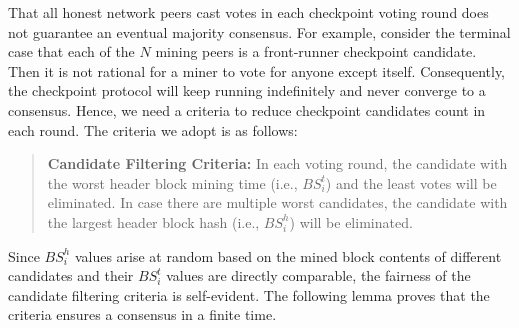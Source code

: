 \documentclass[conference]{IEEEtran}
\begin{document}
That all honest network peers cast votes in each checkpoint voting round does not guarantee an eventual majority consensus. For example, consider the terminal case that each of the $N$ mining peers is a front-runner checkpoint candidate. Then it is not rational for a miner to vote for anyone except itself. Consequently, the checkpoint protocol will keep running indefinitely and never converge to a consensus. Hence, we need a criteria to reduce checkpoint candidates count in each round. The criteria we adopt is as follows:

\begin{quotation}
\textbf{Candidate Filtering Criteria:} In each voting round, the candidate with the worst header block mining time (i.e., $BS_i^t$) and the least votes will be eliminated. In case there are multiple worst candidates, the candidate with the largest header block hash (i.e., $BS_i^h$) will be eliminated.   
\end{quotation}        

Since $BS_i^h$ values arise at random based on the mined block contents of different candidates and their $BS_i^t$ values are directly comparable, the fairness of the candidate filtering criteria is self-evident. The following lemma proves that the criteria ensures a consensus in a finite time.
\end{document}

